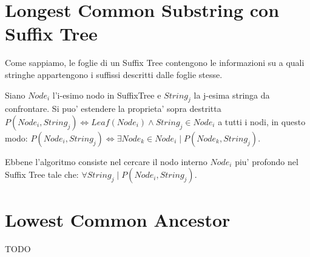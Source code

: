 \section{Longest Common Substring con Suffix Tree}

Come sappiamo, le foglie di un Suffix Tree contengono le informazioni su a quali stringhe appartengono i suffissi descritti dalle foglie stesse.

Siano $Node_i$ l'i-esimo nodo in SuffixTree e $String_j$ la j-esima stringa da confrontare.
Si puo' estendere la proprieta' sopra destritta $P(Node_i, String_j) \Leftrightarrow Leaf(Node_i) \land String_j \in Node_i$ a tutti i nodi, in questo modo:
$P(Node_i, String_j) \Leftrightarrow \exists Node_k \in Node_i \mid P(Node_k, String_j)$.

Ebbene l'algoritmo consiste nel cercare il nodo interno $Node_i$ piu' profondo nel Suffix Tree tale che:
$\forall String_j \mid P(Node_i, String_j)$.

\section{Lowest Common Ancestor}

TODO